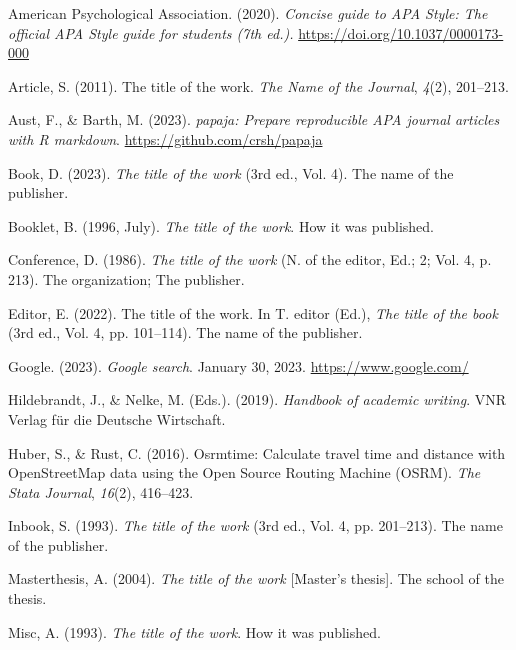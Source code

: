 \documentclass[
  stu,
  floatsintext,
  longtable,
  a4paper,
  nolmodern,
  notxfonts,
  notimes,
  colorlinks=true,linkcolor=black,citecolor=black,urlcolor=black]{apa7}
\newlength{\cslhangindent}
\newenvironment{CSLReferences}[2] %
 {\begin{list}{}{%
  \setlength{\itemindent}{0pt}
  \setlength{\leftmargin}{0pt}
  \setlength{\parsep}{0pt}
  \ifodd #1
   \setlength{\leftmargin}{\cslhangindent}
   \setlength{\itemindent}{-1\cslhangindent}
  \fi
  \setlength{\itemsep}{#2\baselineskip}}}
 {\end{list}}
\begin{document}
\label{refs}
\begin{CSLReferences}{1}{0}
American Psychological Association. (2020). \emph{Concise guide to {APA
Style}: {The} official {APA Style} guide for students (7th ed.).}
\url{https://doi.org/10.1037/0000173-000}

Article, S. (2011). The title of the work. \emph{The Name of the
Journal}, \emph{4}(2), 201--213.

Aust, F., \& Barth, M. (2023). \emph{{papaja}: {Prepare} reproducible
{APA} journal articles with {R} markdown}.
\url{https://github.com/crsh/papaja}

Book, D. (2023). \emph{The title of the work} (3rd ed., Vol. 4). The
name of the publisher.

Booklet, B. (1996, July). \emph{The title of the work}. How it was
published.

Conference, D. (1986). \emph{The title of the work} (N. of the editor,
Ed.; 2; Vol. 4, p. 213). The organization; The publisher.

Editor, E. (2022). The title of the work. In T. editor (Ed.), \emph{The
title of the book} (3rd ed., Vol. 4, pp. 101--114). The name of the
publisher.

Google. (2023). \emph{Google search}. January 30, 2023.
\url{https://www.google.com/}

Hildebrandt, J., \& Nelke, M. (Eds.). (2019). \emph{Handbook of academic
writing}. VNR Verlag f{ü}r die Deutsche Wirtschaft.

Huber, S., \& Rust, C. (2016). Osrmtime: Calculate travel time and
distance with {OpenStreetMap} data using the {Open Source Routing
Machine} ({OSRM}). \emph{The Stata Journal}, \emph{16}(2), 416--423.

Inbook, S. (1993). \emph{The title of the work} (3rd ed., Vol. 4, pp.
201--213). The name of the publisher.

Masterthesis, A. (2004). \emph{The title of the work} {[}Master's
thesis{]}. The school of the thesis.

Misc, A. (1993). \emph{The title of the work}. How it was published.


\end{CSLReferences}
\end{document}
